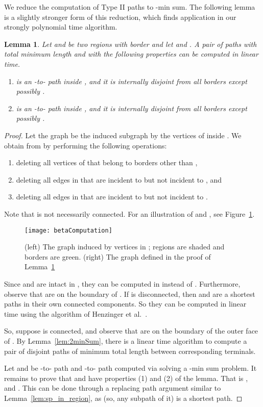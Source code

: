 \documentclass[11pt,twoside]{article}
\newtheorem{lemma}[theorem]{Lemma}
\begin{document}
We reduce the computation of Type II paths to -min sum.  The following lemma is a slightly stronger form of this reduction, which finds application in our strongly polynomial time algorithm. 

\begin{lemma}
 \label{lem:2minSumplus}
Let  and  be two regions with border  and let  and .  A pair of paths  with total minimum length and with the following properties can be computed in linear time.
\begin{enumerate}
\item  is an -to- path inside , and it is internally disjoint from all borders except possibly .
\item  is an -to- path inside , and it is internally disjoint from all borders except possibly .  
\end{enumerate}
\end{lemma}
\begin{proof}
Let the graph  be the induced subgraph by the vertices of  inside .
We obtain  from  by performing the following operations:
\begin{enumerate}
\item deleting all vertices of  that belong to borders other than ,
\item deleting all edges in  that are incident to  but not incident to , and
\item deleting all edges in  that are incident to  but not incident to .
\end{enumerate}
Note that  is not necessarily connected.  For an illustration of  and , see Figure~\ref{fig:mincost}.

\begin{figure}[tbh]
  \centering
    \texttt{[image: betaComputation]}
      \caption{(left) The graph  induced by vertices in ; regions are shaded and borders are green. (right) The graph  defined in the proof of Lemma~\ref{lem:2minSumplus}}
  \label{fig:mincost}
\end{figure}


Since  and  are intact in , they can be computed in  instead of .
Furthermore, observe that  are on the boundary of .  If  is disconnected, then  and  are a shortest paths in their own connected components.  So they can be computed in linear time using the algorithm of Henzinger et al.~\cite{henzinger1997planarShortestPaths}.

So, suppose  is connected, and observe that  are on the boundary of the outer face of .  By Lemma~\ref{lem:2minSum}, there is a linear time algorithm to compute a pair of disjoint paths of minimum total length between corresponding terminals.

Let  and  be -to- path and -to- path computed via solving a -min sum problem. 
It remains to prove that  and  have properties (1) and (2) of the lemma.
That is , and .  This can be done through a replacing path argument similar to Lemma~\ref{lem:sp_in_region}, as  (so, any subpath of it) is a shortest path.
\end{proof}
\end{document}
